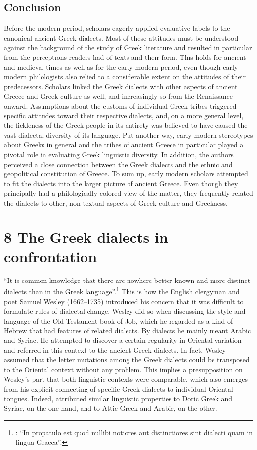 \subsection{Conclusion}
\hypertarget{Toc19704856}{}
Before the modern period, scholars eagerly applied evaluative labels to the canonical ancient Greek dialects. Most of these attitudes must be understood against the background of the study of Greek literature and resulted in particular from the perceptions readers had of texts and their form. This holds for ancient and medieval times as well as for the early modern period, even though early modern philologists also relied to a considerable extent on the attitudes of their predecessors. Scholars linked the Greek dialects with other aspects of ancient Greece and Greek culture as well, and increasingly so from the Renaissance onward. Assumptions about the customs of individual Greek tribes triggered specific attitudes toward their respective dialects, and, on a more general level, the fickleness of the Greek people in its entirety was believed to have caused the vast dialectal diversity of its language. Put another way, early modern stereotypes about Greeks in general and the tribes of ancient Greece in particular played a pivotal role in evaluating Greek linguistic diversity. In addition, the authors perceived a close connection between the Greek dialects and the ethnic and geopolitical constitution of Greece. To sum up, early modern scholars attempted to fit the dialects into the larger picture of ancient Greece. Even though they principally had a philologically colored view of the matter, they frequently related the dialects to other, non-textual aspects of Greek culture and Greekness.

\section{\textsc{8} The Greek dialects in confrontation}
\hypertarget{Toc19704857}{}
“It is common knowledge that there are nowhere better-known and more distinct dialects than in the Greek language”.\footnote{\citet[23]{Wesley1736}: “In propatulo est quod nullibi notiores aut distinctiores sint dialecti quam in lingua Graeca”.} This is how the English clergyman and poet Samuel Wesley (1662–1735) introduced his concern that it was difficult to formulate rules of dialectal change. Wesley did so when discussing the style and language of the Old Testament book of Job, which he regarded as a kind of Hebrew that had features of related dialects. By dialects he mainly meant Arabic and Syriac. He attempted to discover a certain regularity in Oriental variation and referred in this context to the ancient Greek dialects. In fact, Wesley assumed that the letter mutations among the Greek dialects could be transposed to the Oriental context without any problem. This implies a presupposition on Wesley’s part that both linguistic contexts were comparable, which also emerges from his explicit connecting of specific Greek dialects to individual Oriental tongues. Indeed, \citet[24]{Wesley1736} attributed similar linguistic properties to Doric Greek and Syriac, on the one hand, and to Attic Greek and Arabic, on the other.

